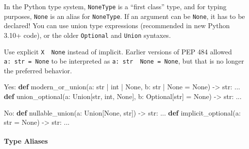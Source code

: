 \documentclass[
]{article}
\newenvironment{Shaded}{}{}
\newcommand{\BuiltInTok}[1]{\textcolor[rgb]{0.00,0.50,0.00}{#1}}
\newcommand{\KeywordTok}[1]{\textcolor[rgb]{0.00,0.44,0.13}{\textbf{#1}}}
\newcommand{\NormalTok}[1]{#1}
\newcommand{\OperatorTok}[1]{\textcolor[rgb]{0.40,0.40,0.40}{#1}}
\newcommand{\VariableTok}[1]{\textcolor[rgb]{0.10,0.09,0.49}{#1}}
\begin{document}
In the Python type system, \texttt{NoneType} is a ``first class'' type,
and for typing purposes, \texttt{None} is an alias for
\texttt{NoneType}. If an argument can be \texttt{None}, it has to be
declared! You can use \texttt{\textbar{}} union type expressions
(recommended in new Python 3.10+ code), or the older \texttt{Optional}
and \texttt{Union} syntaxes.

Use explicit \texttt{X\ \textbar{}\ None} instead of implicit. Earlier
versions of PEP 484 allowed \texttt{a:\ str\ =\ None} to be interpreted
as \texttt{a:\ str\ \textbar{}\ None\ =\ None}, but that is no longer
the preferred behavior.

\begin{samepage}
\begin{Shaded}
\begin{Highlighting}[]
\NormalTok{Yes:}
\KeywordTok{def}\NormalTok{ modern\_or\_union(a: }\BuiltInTok{str} \OperatorTok{|} \BuiltInTok{int} \OperatorTok{|} \VariableTok{None}\NormalTok{, b: }\BuiltInTok{str} \OperatorTok{|} \VariableTok{None} \OperatorTok{=} \VariableTok{None}\NormalTok{) }\OperatorTok{{-}\textgreater{}} \BuiltInTok{str}\NormalTok{:}
\NormalTok{  ...}
\KeywordTok{def}\NormalTok{ union\_optional(a: Union[}\BuiltInTok{str}\NormalTok{, }\BuiltInTok{int}\NormalTok{, }\VariableTok{None}\NormalTok{], b: Optional[}\BuiltInTok{str}\NormalTok{] }\OperatorTok{=} \VariableTok{None}\NormalTok{) }\OperatorTok{{-}\textgreater{}} \BuiltInTok{str}\NormalTok{:}
\NormalTok{  ...}
\end{Highlighting}
\end{Shaded}
\end{samepage}

\begin{samepage}
\begin{Shaded}
\begin{Highlighting}[]
\NormalTok{No:}
\KeywordTok{def}\NormalTok{ nullable\_union(a: Union[}\VariableTok{None}\NormalTok{, }\BuiltInTok{str}\NormalTok{]) }\OperatorTok{{-}\textgreater{}} \BuiltInTok{str}\NormalTok{:}
\NormalTok{  ...}
\KeywordTok{def}\NormalTok{ implicit\_optional(a: }\BuiltInTok{str} \OperatorTok{=} \VariableTok{None}\NormalTok{) }\OperatorTok{{-}\textgreater{}} \BuiltInTok{str}\NormalTok{:}
\NormalTok{  ...}
\end{Highlighting}
\end{Shaded}
\end{samepage}

\paragraph{Type Aliases}
\end{document}
